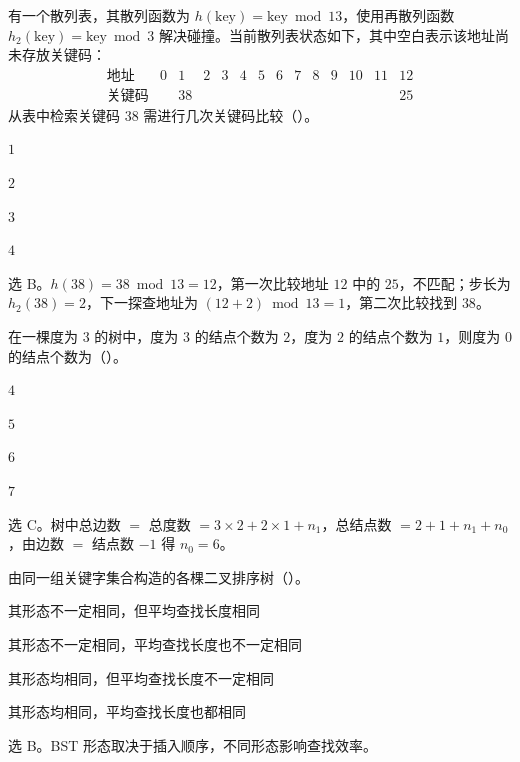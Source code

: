 \begin{question}
有一个散列表，其散列函数为 $h(\mathrm{key})=\mathrm{key}\bmod 13$，使用再散列函数 $h_2(\mathrm{key})=\mathrm{key}\bmod 3$ 解决碰撞。当前散列表状态如下，其中空白表示该地址尚未存放关键码：
\[
\begin{array}{c|ccccccccccccc}
\text{地址} &0&1&2&3&4&5&6&7&8&9&10&11&12\\ \hline
\text{关键码} &&38&&&&&&&&&&&25
\end{array}
\]
从表中检索关键码 $38$ 需进行几次关键码比较（\quad）。
\begin{choiceoptions}[1]
  \item $1$
  \item $2$
  \item $3$
  \item $4$
\end{choiceoptions}
\begin{solution}
选 B。$h(38)=38\bmod13=12$，第一次比较地址 $12$ 中的 $25$，不匹配；步长为 $h_2(38)=2$，下一探查地址为 $(12+2)\bmod13=1$，第二次比较找到 $38$。
\end{solution}
\end{question}


\begin{question}
在一棵度为 $3$ 的树中，度为 $3$ 的结点个数为 $2$，度为 $2$ 的结点个数为 $1$，则度为 $0$ 的结点个数为（\quad）。
\begin{choiceoptions}[2]
  \item $4$
  \item $5$
  \item $6$
  \item $7$
\end{choiceoptions}
\begin{solution}
选 C。树中总边数 $=$ 总度数 $=3\times2+2\times1+n_1$，总结点数 $=2+1+n_1+n_0$，由边数 $=$ 结点数 $-1$ 得 $n_0=6$。
\end{solution}
\end{question}

\begin{question}
由同一组关键字集合构造的各棵二叉排序树（\quad）。
\begin{choiceoptions}[2]
  \item 其形态不一定相同，但平均查找长度相同
  \item 其形态不一定相同，平均查找长度也不一定相同
  \item 其形态均相同，但平均查找长度不一定相同
  \item 其形态均相同，平均查找长度也都相同
\end{choiceoptions}
\begin{solution}
选 B。BST 形态取决于插入顺序，不同形态影响查找效率。
\end{solution}
\end{question}

